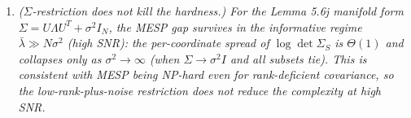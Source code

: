 \documentclass[
]{article}
\begin{document}
\begin{enumerate}
{substituted for the partition cost; the anti-tautology objection that
sinks the Type-II import (no kernel $K$ makes the Type-II cost a $\log\det
K_S$) does not arise, because no substitution is performed.}
\item \emph{($\Sigma$-restriction does not kill the hardness.) For the
Lemma 5.6j manifold form $\Sigma=U\Lambda U^T+\sigma^2 I_N$, the MESP gap
survives in the informative regime $\bar\lambda\gg N\sigma^2$ (high SNR):
the per-coordinate spread of $\log\det\Sigma_S$ is $\Theta(1)$ and collapses
only as $\sigma^2\to\infty$ (when $\Sigma\to\sigma^2 I$ and all subsets tie).
This is consistent with MESP being NP-hard even for rank-deficient
covariance, so the low-rank-plus-noise restriction does not reduce the
complexity at high SNR.}
\end{enumerate}
\end{document}
